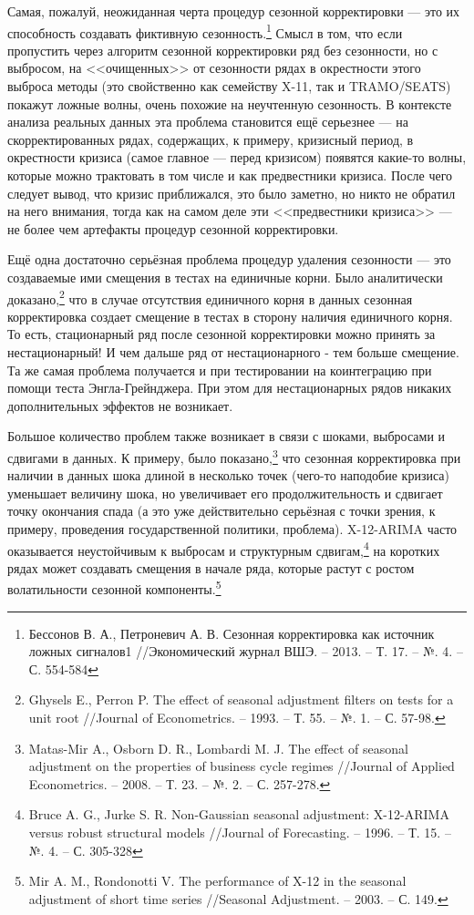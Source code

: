 \documentclass[final,pdftex]{../../template/epsilonj}\usepackage[]{graphicx}\usepackage[]{color}
\begin{document}
Самая, пожалуй, неожиданная черта процедур сезонной корректировки --- это их способность создавать фиктивную сезонность.\footnote{Бессонов В. А., Петроневич А. В. Сезонная корректировка как источник ложных сигналов1 //Экономический журнал ВШЭ. – 2013. – Т. 17. – №. 4. – С. 554-584} Смысл в том, что если пропустить через алгоритм сезонной корректировки ряд без сезонности, но с выбросом, на <<очищенных>> от сезонности рядах в окрестности этого выброса методы (это свойственно как семейству X-11, так и TRAMO/SEATS) покажут ложные волны, очень похожие на неучтенную сезонность. В контексте анализа реальных данных эта проблема становится ещё серьезнее --- на скорректированных рядах, содержащих, к примеру, кризисный период, в окрестности кризиса (самое главное --- перед кризисом) появятся какие-то волны, которые можно трактовать в том числе и как предвестники кризиса. После чего следует вывод, что кризис приближался, это было заметно, но никто не обратил на него внимания, тогда как на самом деле эти <<предвестники кризиса>> --- не более чем артефакты процедур сезонной корректировки. 

Ещё одна достаточно серьёзная проблема процедур удаления сезонности --- это создаваемые ими смещения в тестах на единичные корни. Было аналитически доказано,\footnote{Ghysels E., Perron P. The effect of seasonal adjustment filters on tests for a unit root //Journal of Econometrics. – 1993. – Т. 55. – №. 1. – С. 57-98.} что в случае отсутствия единичного корня в данных сезонная корректировка создает смещение в тестах в сторону наличия единичного корня. То есть, стационарный ряд после сезонной корректировки можно принять за нестационарный! И чем дальше ряд от нестационарного - тем больше смещение. Та же самая проблема получается и при тестировании на коинтеграцию при помощи теста Энгла-Грейнджера. При этом для нестационарных рядов никаких дополнительных эффектов не возникает. 

Большое количество проблем также возникает в связи с шоками, выбросами и сдвигами в данных. К примеру, было показано,\footnote{Matas-Mir A., Osborn D. R., Lombardi M. J. The effect of seasonal adjustment on the properties of business cycle regimes //Journal of Applied Econometrics. – 2008. – Т. 23. – №. 2. – С. 257-278.} что сезонная корректировка при наличии в данных шока длиной в несколько точек (чего-то наподобие кризиса) уменьшает величину шока, но увеличивает его продолжительность и сдвигает точку окончания спада (а это уже действительно серьёзная с точки зрения, к примеру, проведения государственной политики, проблема). X-12-ARIMA часто оказывается неустойчивым к выбросам и структурным сдвигам,\footnote{Bruce A. G., Jurke S. R. Non-Gaussian seasonal adjustment: X-12-ARIMA versus robust structural models //Journal of Forecasting. – 1996. – Т. 15. – №. 4. – С. 305-328} на коротких рядах может создавать смещения в начале ряда, которые растут с ростом волатильности сезонной компоненты.\footnote{Mir A. M., Rondonotti V. The performance of X-12 in the seasonal adjustment of short time series //Seasonal Adjustment. – 2003. – С. 149.}
\end{document}
